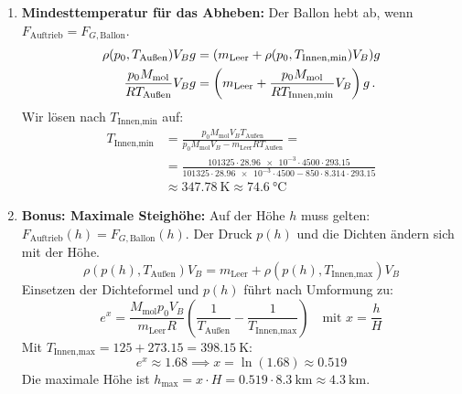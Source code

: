 \documentclass[ngerman]{scrreprt}
\newenvironment{loesungbox}[1]
  {\needspace{5\baselineskip}\begin{loesungboxstyle}[frametitle={#1}]}
  {\end{loesungboxstyle}}
\begin{document}
\begin{loesungbox}{Lösung zu \Cref{aufg:ballonfahrt}}
\begin{enumerate}
    \item \textbf{Mindesttemperatur für das Abheben:}
    Der Ballon hebt ab, wenn $F_{\text{Auftrieb}} = F_{G, \text{Ballon}}$. 
    \begin{align}
        \rho(p_0, T_{\text{Außen}}) V_B g &= (m_{\text{Leer}} + \rho(p_0, T_{\text{Innen,min}}) V_B) g \\
        \frac{p_0 M_{\text{mol}}}{R T_{\text{Außen}}} V_B g &= \left(m_\text{Leer} + \frac{p_0 M_{\text{mol}}}{R T_{\text{Innen,min}}} V_B\right) g \,.
    \end{align}
    Wir lösen nach $T_{\text{Innen,min}}$ auf:
    \begin{align}
        T_{\text{Innen,min}} &= \frac{p_0 M_{\text{mol}} V_B T_\text{Außen}}{p_0 M_{\text{mol}} V_B - m_{\text{Leer}} R T_\text{Außen}} = \\
        &= \frac{101325\cdot \num{28.96e-3} \cdot 4500 \cdot \num{293.15} }{101325 \cdot \num{28.96e-3} \cdot 4500 - 850 \cdot \num{8.314} \cdot \num{293.15}} \\
        &\approx \SI{347.78}{\kelvin} \approx \SI{74.6}{\celsius}
    \end{align}
    
    \item \textbf{Bonus: Maximale Steighöhe:}
    Auf der Höhe $h$ muss gelten: $F_{\text{Auftrieb}}(h) = F_{G, \text{Ballon}}(h)$. Der Druck $p(h)$ und die Dichten ändern sich mit der Höhe.
    \begin{equation}
        \rho(p(h), T_{\text{Außen}}) V_B = m_{\text{Leer}} + \rho(p(h), T_{\text{Innen,max}}) V_B
    \end{equation}
    Einsetzen der Dichteformel und $p(h)$ führt nach Umformung zu: 
    \begin{equation}
        e^x = \frac{M_{\text{mol}} p_0 V_B}{m_{\text{Leer}} R} \left(\frac{1}{T_{\text{Außen}}} - \frac{1}{T_{\text{Innen,max}}}\right) \quad \text{mit } x = \frac{h}{H}
    \end{equation}
    Mit $T_{\text{Innen,max}} = 125 + \num{273.15} = \SI{398.15}{\kelvin}$:
    \begin{equation}
        e^x \approx 1.68 \implies x = \ln(\num{1.68}) \approx \num{0.519}
    \end{equation}
    Die maximale Höhe ist $h_{\text{max}} = x \cdot H = \num{0.519} \cdot \SI{8.3}{\kilo\meter} \approx \SI{4.3}{\kilo\meter}$. 
\end{enumerate}
\end{loesungbox}
\end{document}
